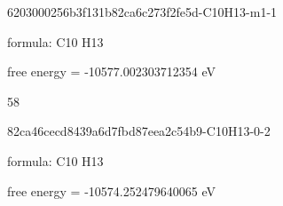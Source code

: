 \documentclass{article}
\begin{document}
\vspace{1cm}


6203000256b3f131b82ca6c273f2fe5d-C10H13-m1-1



formula: C10 H13



free energy = -10577.002303712354 eV

58

\vspace{1cm}


82ca46cecd8439a6d7fbd87eea2c54b9-C10H13-0-2



formula: C10 H13



free energy = -10574.252479640065 eV
\end{document}
